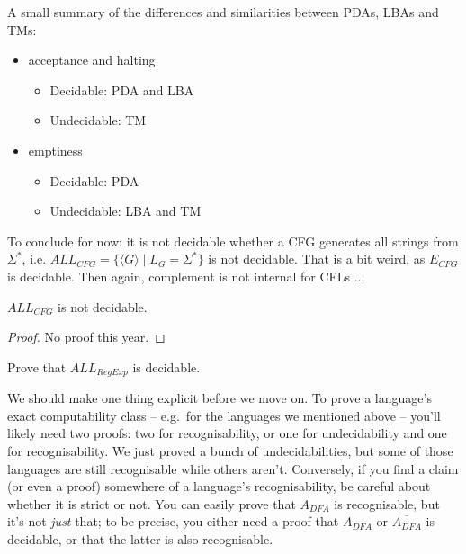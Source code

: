 \begin{theorem}
	A small summary of the differences and similarities between PDAs, LBAs
	and TMs:
	\begin{itemize}
		\item acceptance and halting
		\begin{itemize}
			\item Decidable: PDA and LBA
			\item Undecidable: TM
		\end{itemize}

		\item emptiness
		\begin{itemize}
			\item Decidable: PDA
			\item Undecidable: LBA and TM
		\end{itemize}
	\end{itemize}
\end{theorem}

To conclude for now: it is not decidable whether a CFG generates all
strings from $\Sigma^*$, i.e. $ALL_{CFG} = \{\langle G \rangle\mid L_G =
\Sigma^*\}$ is not decidable. That is a bit weird, as $E_{CFG}$ is
decidable. Then again, complement is not internal for CFLs ...

\begin{theorem}\label{allcfg}
$ALL_{CFG}$ is not decidable.
\end{theorem}
\begin{proof}
No proof this year.  %
\end{proof}

\begin{exercise}
Prove that $ALL_{RegExp}$ is decidable.
\end{exercise}
We should make one thing explicit before we move on. To prove a language's exact computability class -- e.g.\ for the languages we mentioned above -- you'll likely need two proofs: two for recognisability, or one for undecidability and one for recognisability. We just proved a bunch of undecidabilities, but some of those languages are still recognisable while others aren't. Conversely, if you find a claim (or even a proof) somewhere of a language's recognisability, be careful about whether it is strict or not. You can easily prove that $A_{DFA}$ is recognisable, but it's not \emph{just} that; to be precise, you either need a proof that $A_{DFA}$ or $\overline{A_{DFA}}$ is decidable, or that the latter is also recognisable.

